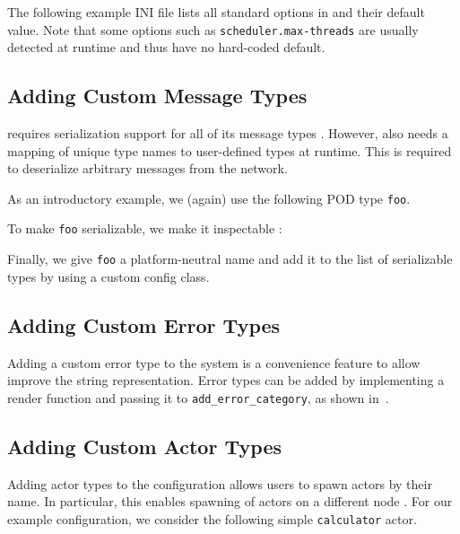 The following example INI file lists all standard options in \lib and their
default value. Note that some options such as \lstinline^scheduler.max-threads^
are usually detected at runtime and thus have no hard-coded default.

\clearpage
{}

\clearpage
\subsection{Adding Custom Message Types}
\label{add-custom-message-type}

\lib requires serialization support for all of its message types
. However, \lib also needs a mapping of unique type names
to user-defined types at runtime. This is required to deserialize arbitrary
messages from the network.

As an introductory example, we (again) use the following POD type
\lstinline^foo^.


To make \lstinline^foo^ serializable, we make it inspectable
:


Finally, we give \lstinline^foo^ a platform-neutral name and add it to the list
of serializable types by using a custom config class.


\subsection{Adding Custom Error Types}

Adding a custom error type to the system is a convenience feature to allow
improve the string representation. Error types can be added by implementing a
render function and passing it to \lstinline^add_error_category^, as shown
in~.

\clearpage
\subsection{Adding Custom Actor Types \experimental}
\label{add-custom-actor-type}

Adding actor types to the configuration allows users to spawn actors by their
name. In particular, this enables spawning of actors on a different node
. For our example configuration, we consider the following
simple \lstinline^calculator^ actor.

